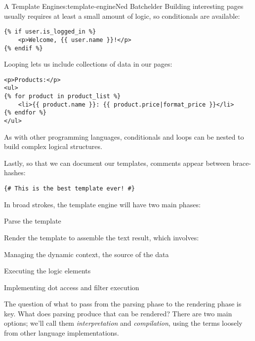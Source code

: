 \begin{aosachapter}{A Template Engine}{s:template-engine}{Ned Batchelder}
Building interesting pages usually requires at least a small amount of
logic, so conditionals are available:

\begin{verbatim}
{% if user.is_logged_in %}
    <p>Welcome, {{ user.name }}!</p>
{% endif %}
\end{verbatim}

Looping lets us include collections of data in our pages:

\begin{verbatim}
<p>Products:</p>
<ul>
{% for product in product_list %}
    <li>{{ product.name }}: {{ product.price|format_price }}</li>
{% endfor %}
</ul>
\end{verbatim}

As with other programming languages, conditionals and loops can be
nested to build complex logical structures.

Lastly, so that we can document our templates, comments appear between
brace-hashes:

\begin{verbatim}
{# This is the best template ever! #}
\end{verbatim}

\label{implementation-approaches}

In broad strokes, the template engine will have two main phases:

\begin{aosaitemize}

\item
  Parse the template
\item
  Render the template to assemble the text result, which involves:

  \begin{aosaitemize}
  
  \item
    Managing the dynamic context, the source of the data
  \item
    Executing the logic elements
  \item
    Implementing dot access and filter execution
  \end{aosaitemize}
\end{aosaitemize}

The question of what to pass from the parsing phase to the rendering
phase is key. What does parsing produce that can be rendered? There are
two main options; we'll call them \emph{interpretation} and
\emph{compilation}, using the terms loosely from other language
implementations.


\end{aosachapter}
